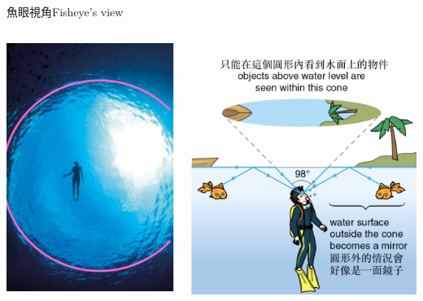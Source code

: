 \documentclass[beamer=true]{standalone}
\begin{document}
\begin{frame}{魚眼視角Fisheye's view}
\begin{columns}
        {\par\centering
        \includegraphics[width=0.75\linewidth]{assets/e1e21d4.png}\par}
        {\par\centering
        \includegraphics[width=\linewidth]{assets/8jdun98232.png}\par}
\end{columns} 
\end{frame}
\end{document}
